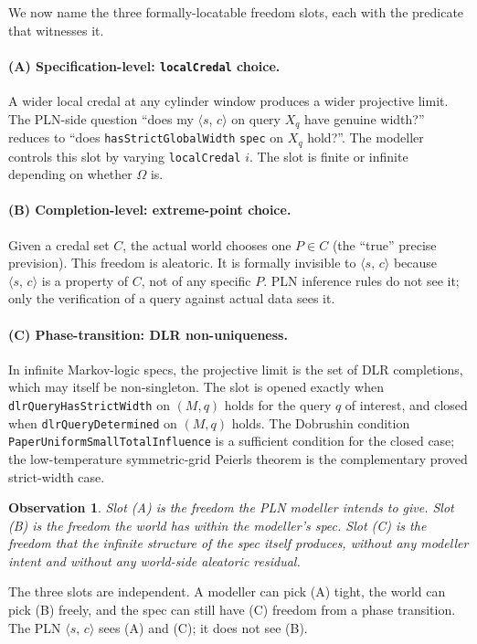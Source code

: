 \documentclass[]{article}
\newtheorem{observation}[theorem]{Observation}
\newcommand{\lid}[1]{{\ttfamily\nolinkurl{#1}}}
\newcommand{\STV}[2]{\langle #1,\, #2 \rangle}
\begin{document}
We now name the three formally-locatable freedom slots, each with the
predicate that witnesses it.

\paragraph{(A) Specification-level: \lid{localCredal} choice.}
A wider local credal at any cylinder window produces a wider projective
limit. The PLN-side question ``does my $\STV{s}{c}$ on query $X_q$ have
genuine width?'' reduces to ``does \lid{hasStrictGlobalWidth}
\lid{spec} on $X_q$ hold?''. The modeller controls this slot by varying
\lid{localCredal}{} $i$. The slot is finite or infinite depending on
whether $\Omega$ is.

\paragraph{(B) Completion-level: extreme-point choice.}
Given a credal set $C$, the actual world chooses one $P \in C$ (the
``true'' precise prevision). This freedom is aleatoric. It is formally
invisible to $\STV{s}{c}$ because $\STV{s}{c}$ is a property of $C$, not
of any specific $P$. PLN inference rules do not see it; only the
verification of a query against actual data sees it.

\paragraph{(C) Phase-transition: DLR non-uniqueness.}
In infinite Markov-logic specs, the projective limit is the set of DLR
completions, which may itself be non-singleton. The slot is opened
exactly when \lid{dlrQueryHasStrictWidth} on $(M, q)$ holds for the
query $q$ of interest, and closed when \lid{dlrQueryDetermined} on $(M, q)$
holds. The Dobrushin condition \lid{PaperUniformSmallTotalInfluence}
is a sufficient condition for the closed case; the low-temperature
symmetric-grid Peierls theorem is the complementary proved strict-width
case.

\begin{observation}
Slot (A) is the freedom the PLN modeller intends to give. Slot (B) is
the freedom the world has within the modeller's spec. Slot (C) is the
freedom that the infinite structure of the spec itself produces, without
any modeller intent and without any world-side aleatoric residual.
\end{observation}

The three slots are independent. A modeller can pick (A) tight, the
world can pick (B) freely, and the spec can still have (C) freedom from
a phase transition. The PLN $\STV{s}{c}$ sees (A) and (C); it does not
see (B).
\end{document}
